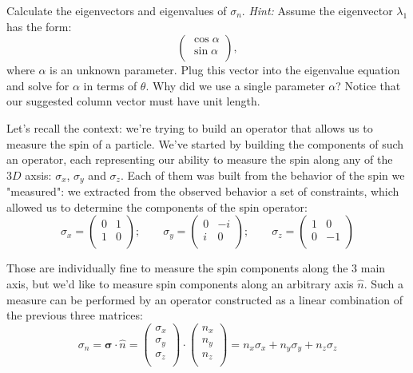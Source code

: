 \documentclass[solutions.tex]{subfiles}
\begin{document}
\maketitle
\begin{exercise}
Calculate the eigenvectors and eigenvalues of $\sigma_n$. \textit{Hint:}
Assume the eigenvector $\lambda_1$ has the form:
\[
	\begin{pmatrix}
		\cos\alpha \\
		\sin\alpha \\
	\end{pmatrix},
\]
where $\alpha$ is an unknown parameter. Plug this vector into the eigenvalue
equation and solve for $\alpha$ in terms of $\theta$. Why did we use a single
parameter $\alpha$? Notice that our suggested column vector must have unit
length.
\end{exercise}
Let's recall the context: we're trying to build an operator that allows
us to measure the spin of a particle. We've started by building the
components of such an operator, each representing our ability to measure
the spin along any of the $3D$ axsis: $\sigma_x$, $\sigma_y$ and $\sigma_z$.
Each of them was built from the behavior of the spin we "measured": we
extracted from the observed behavior a set of constraints, which allowed
us to determine the components of the spin operator: \\

\[
	\sigma_x = \begin{pmatrix}
		0 & 1 \\
		1 & 0 \\
	\end{pmatrix};\qquad \sigma_y = \begin{pmatrix}
		0 & -i \\
		i & 0 \\
	\end{pmatrix};\qquad \sigma_z = \begin{pmatrix}
		1 & 0 \\
		0 & -1 \\
	\end{pmatrix}
\]

Those are individually fine to measure the spin components
along the $3$ main axis, but we'd like to measure spin components
along an arbitrary axis $\hat{n}$. Such a measure can be performed
by an operator constructed as a linear combination of the previous
three matrices:
\[
	\sigma_n = \bm{\sigma} \cdot \hat{n} = \begin{pmatrix}
		\sigma_x \\
		\sigma_y \\
		\sigma_z \\
	\end{pmatrix} \cdot \begin{pmatrix}
		n_x \\
		n_y \\
		n_z \\
	\end{pmatrix}
	= n_x\sigma_x + n_y\sigma_y + n_z\sigma_z
\]
\end{document}
